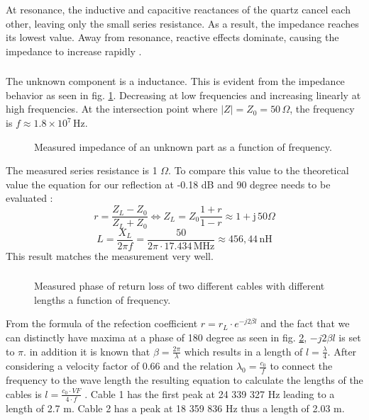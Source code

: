 \documentclass[a4paper,12pt]{article}
\begin{document}
	At resonance, the inductive and capacitive reactances of the quartz cancel each other,
	leaving only the small series resistance. As a result, the impedance reaches
	its lowest value. Away from resonance, reactive effects dominate, causing the
	impedance to increase rapidly \cite{tietze}.
	
	
	\subsubsection{}\label{ch:355}
	The unknown component is a inductance. This is evident from the impedance behavior as seen in fig. \ref{fig:355}. Decreasing at low frequencies and increasing linearly at high frequencies. At the intersection point where $|Z| = Z_0 = 50\,\Omega$, the frequency is $f \approx 1.8 \times 10^7\,\mathrm{Hz}$.
	\begin{figure}[H]
		\centering
		
		\caption{Measured impedance of an unknown part as a function of frequency.}
		\label{fig:355}
	\end{figure}
	The measured series resistance is 1 $\Omega$. To compare this value to the theoretical value the equation for our reflection at -0.18 dB and 90 degree needs to be evaluated \cite{bangert}:
	\[r=\frac{Z_L - Z_0}{Z_L + Z_0} \Leftrightarrow Z_L = Z_0 \frac{1 + r}{1 - r} \approx 1 + \mathrm{j} \, 50\Omega\]
	\[L = \frac{X_L}{2\pi f} = \frac{50}{2\pi \cdot 17.434 \, \mathrm{MHz}} \approx 456,44 \, \mathrm{nH}\]
	This result matches the measurement very well.
	
	\subsubsection{}
		
	\begin{figure}[H]
		\centering
		
		\caption{Measured phase of return loss of two different cables with different lengths a function of frequency.}
		\label{fig:356}
	\end{figure}
	From the formula of the refection coefficient $r = r_L \cdot e^{-j2\beta l}$ and the fact that we can distinctly have maxima at a phase of 180 degree as seen in fig. \ref{fig:356}, $-j2\beta l$ is set to $\pi$. in addition it is known that $\beta = \frac{2\pi}{\lambda}$ which results in a length of $l = \frac{\lambda}{4}$. After considering a velocity factor of 0.66 and the relation $\lambda_0 = \frac{c_0}{f}$ to connect the frequency to the wave length the resulting equation to calculate the lengths of the cables is $l = \frac{c_0 \cdot VF}{4 \cdot f}$ \cite{agilent_vna}. 
	Cable 1 has  the first peak at 24 339 327 Hz leading to a length of 2.7 m. Cable 2 has a peak at 18 359 836 Hz thus a length of 2.03 m.
\end{document}
